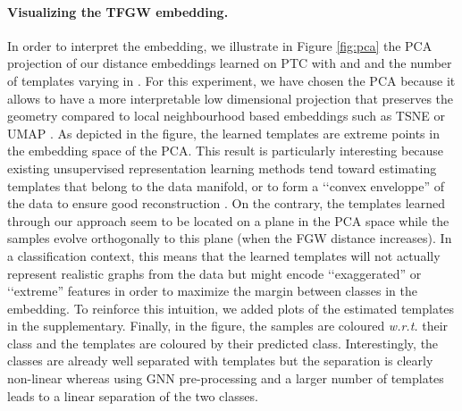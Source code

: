 \documentclass{article}
\begin{document}
\paragraph{Visualizing the TFGW embedding.}{
In order to interpret the  embedding, we illustrate in Figure
\ref{fig:pca} the PCA projection of our distance embeddings learned on
PTC with  and  and the number of templates  varying in . {For this experiment, we have chosen the PCA because it allows to have 
a more interpretable low dimensional projection that preserves the geometry compared to local 
neighbourhood based embeddings such as TSNE \cite{van2008visualizing} or UMAP
\cite{mcinnes2018umap}. As depicted in the figure, the learned templates are extreme
points in the embedding space of the PCA. This result is particularly interesting because existing unsupervised  representation learning methods
tend toward estimating templates that belong to the data manifold, or to form a
‘‘convex enveloppe'' of the data to ensure good reconstruction \cite{vincent2021online,xu2020gromov}. On the contrary, the templates learned through our approach seem to be located on a plane in the PCA space while the samples evolve orthogonally to this plane (when the FGW distance increases).
In a classification context, this means that the learned templates will not actually represent realistic graphs from the data
but might encode ‘‘exaggerated'' or ‘‘extreme'' features in order to maximize the margin
between classes in the embedding. To reinforce this intuition, we added plots of the
estimated templates in the supplementary. Finally, in the figure, the samples are coloured \textit{w.r.t.} their class and the templates are coloured by
their predicted class. Interestingly, the classes are already well separated with  templates but the separation is clearly
non-linear whereas using GNN pre-processing and a larger number of templates leads to a linear separation of the two classes.}


}
\end{document}
